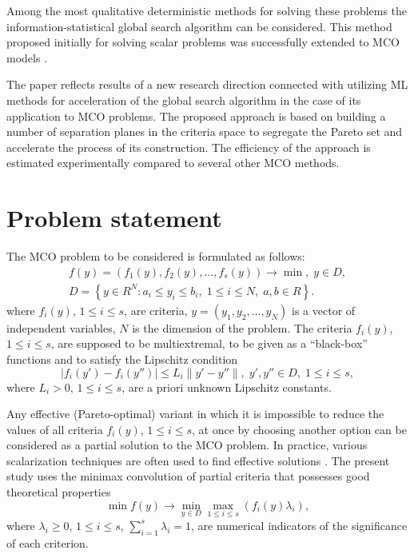 \documentclass[runningheads]{llncs}
\begin{document}
Among the most qualitative deterministic methods for solving these problems the information-statistical global search algorithm \cite{Sergeyev2013,Strongin2000} can be considered. This method proposed initially for solving scalar problems was successfully extended to MCO models \cite{GergelKozinovAPI2016,Gergel2018}.

The paper reflects results of a new research direction connected with utilizing ML methods for acceleration of the global search algorithm in the case of its application to MCO problems. The proposed approach is based on building a number of separation planes in the criteria space to segregate the Pareto set and accelerate the process of its construction. The efficiency of the approach is estimated experimentally compared to several other MCO methods.


\section{Problem statement}

The MCO problem to be considered is formulated as follows:
\begin{gather}
f(y)=(f_1 (y),f_2 (y),\dots ,f_s (y)) \to \min, \; y\in D,  \label{eq:1} \\ 
D=\left\{ y \in R^N: a_i \leq y_i \leq b_i, \; 1 \leq i \leq N, \; a,b \in R \right\}.\label{eq:2} 
\end{gather}
where $f_i (y)$, $1 \leq i \leq s$, are  criteria, $y=(y_1,y_2, \dots,y_N)$ is a vector of independent variables, $N$ is the dimension of the problem. The criteria $f_i (y)$, $1 \leq i \leq s$, are supposed to be multiextremal, to be given as a ``black-box'' functions and to satisfy the Lipschitz condition
\begin{equation}
|f_i (y')-f_i (y'')| \leq L_i \|y'-y''\|, \; y',y'' \in D, \; 1 \leq i \leq s,
\label{eq:3}
\end{equation}
where $L_i>0$, $1 \leq i \leq s$, are a priori unknown Lipschitz constants.

Any effective (Pareto-optimal) variant  in which it is impossible to reduce the values of all criteria $f_i (y)$, $1 \leq i \leq s$, at once by choosing another option   can be considered as a partial solution to the MCO problem. In practice, various scalarization techniques are often used to find effective solutions \cite{Ehrgott2005,GergelKozinov2020,Marler2004,Pardalos2017}. The present study uses the minimax convolution of partial criteria that possesses good theoretical properties
\begin{equation}
\min{f(y)} \to \min_{y\in D}{\max_{1 \leq i \leq s}{(f_i (y) \lambda_i )}} ,
\label{eq:4}
\end{equation}
where $\lambda_i \geq 0$, $1 \leq i \leq s$, $\sum_{i=1}^s{\lambda_i}=1$, are numerical indicators of the significance of each criterion. 
\end{document}
